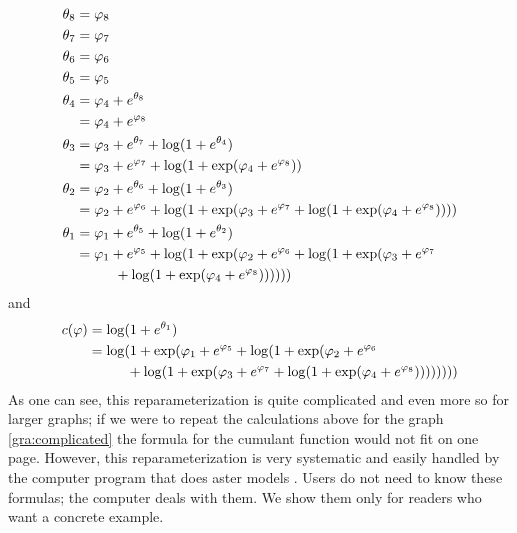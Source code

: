 \documentclass[11pt]{article}
\begin{document}
\begin{equation} \label{eq:big-phi-to-theta}
\begin{split}
   \theta_8 & = \varphi_8 \\
   \theta_7 & = \varphi_7 \\
   \theta_6 & = \varphi_6 \\
   \theta_5 & = \varphi_5 \\
   \theta_4 & = \varphi_4 + e^{\theta_8} \\
            & = \varphi_4 + e^{\varphi_8} \\
   \theta_3 & = \varphi_3 + e^{\theta_7} + \log(1 + e^{\theta_4}) \\
            & = \varphi_3 + e^{\varphi_7}
                + \log(1 + \exp(\varphi_4 + e^{\varphi_8})) \\
   \theta_2 & = \varphi_2 + e^{\theta_6} + \log(1 + e^{\theta_3}) \\
            & = \varphi_2 + e^{\varphi_6}
                + \log(1 + \exp(
            \varphi_3 + e^{\varphi_7}
                + \log(1 + \exp(\varphi_4 + e^{\varphi_8})))) \\
   \theta_1 & = \varphi_1 + e^{\theta_5} + \log(1 + e^{\theta_2}) \\
            & = \varphi_1 + e^{\varphi_5} + \log(1 + \exp(
            \varphi_2 + e^{\varphi_6}
                + \log(1 + \exp(
            \varphi_3 + e^{\varphi_7}
            \\
            & \hphantom{=} \qquad
                + \log(1 + \exp(\varphi_4 + e^{\varphi_8}))))))
\end{split}
\end{equation}
and
\begin{align*}
   c(\varphi)
   & =
   \log(1 + e^{\theta_1})
   \\
   & =
   \log(1 + \exp(
            \varphi_1 + e^{\varphi_5} + \log(1 + \exp(
            \varphi_2 + e^{\varphi_6}
            \\
            & \hphantom{=} \qquad
                + \log(1 + \exp(
            \varphi_3 + e^{\varphi_7}
                + \log(1 + \exp(\varphi_4 + e^{\varphi_8}))))))
   ))
\end{align*}
As one can see, this reparameterization is quite complicated
and even more so for
larger graphs; if we were to repeat the calculations above for the graph
\eqref{gra:complicated} the formula for the cumulant function would not
fit on one page.  However, this reparameterization is very systematic
and easily handled by the
computer program that does aster models
\citep{aster-package}.  Users do not need to know these formulas; the computer
deals with them.  We show them only for readers who want a concrete example.
\end{document}
